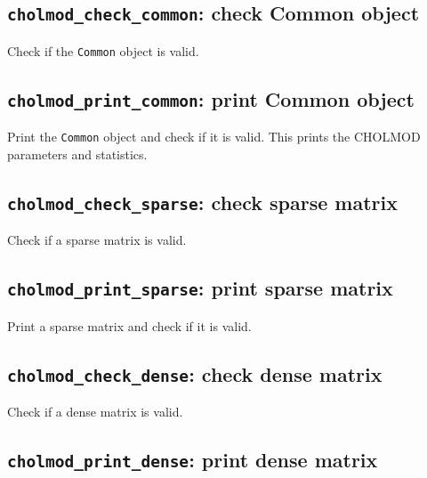\documentclass[11pt]{article}
\begin{document}
\subsection{{\tt cholmod\_check\_common}: check Common object}


Check if the {\tt Common} object is valid.

\subsection{{\tt cholmod\_print\_common}: print Common object}


Print the {\tt Common} object and check if it is valid.
This prints the CHOLMOD parameters and statistics.

\subsection{{\tt cholmod\_check\_sparse}: check sparse matrix}


Check if a sparse matrix is valid.

\subsection{{\tt cholmod\_print\_sparse}: print sparse matrix}


Print a sparse matrix and check if it is valid.

\subsection{{\tt cholmod\_check\_dense}: check dense matrix}


Check if a dense matrix is valid.

\subsection{{\tt cholmod\_print\_dense}: print dense matrix}
\end{document}
